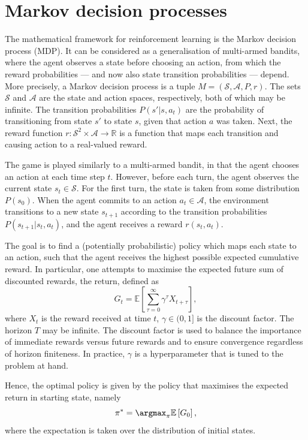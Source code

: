 \section{Markov decision processes}
The mathematical framework for reinforcement learning is the Markov decision process (MDP).
It can be considered as a generalisation of multi-armed bandits, where the agent observes a state before choosing an action, from which the reward probabilities — and now also state transition probabilities — depend.
More precisely, a Markov decision process is a tuple $M = (\mathcal{S}, \mathcal{A}, P, r)$.
The sets $\mathcal{S}$ and $\mathcal{A}$ are the state and action spaces, respectively, both of which may be infinite.
The transition probabilities $P(s' | s, a_t)$ are the probability of transitioning from state $s'$ to state $s$, given that action $a$ was taken.
Next, the reward function $r : \mathcal{S}^2 \times \mathcal{A} \to \mathbb{R}$ is a function that maps each transition and causing action to a real-valued reward.

The game is played similarly to a multi-armed bandit, in that the agent chooses an action at each time step $t$.
However, before each turn, the agent observes the current state $s_t \in \mathcal{S}$.
For the first turn, the state is taken from some distribution $P(s_0)$.
When the agent commits to an action $a_t \in \mathcal{A}$, the environment transitions to a new state $s_{t+1}$ according to the transition probabilities $P(s_{t+1} | s_t, a_t)$, and the agent receives a reward $r(s_t, a_t)$.

The goal is to find a (potentially probabilistic) policy which maps each state to an action, such that the agent receives the highest possible expected cumulative reward.
In particular, one attempts to maximise the expected future sum of discounted rewards, the return, defined as
\begin{equation}
    G_t = \mathbb{E} \left[ \sum_{\tau=0}^{\infty} \gamma^\tau X_{t+\tau} \right],
\end{equation}
where $X_t$ is the reward received at time $t$, $\gamma \in (0,1]$ is the discount factor.
The horizon $T$ may be infinite.
The discount factor is used to balance the importance of immediate rewards versus future rewards and to ensure convergence regardless of horizon finiteness.
In practice, $\gamma$ is a hyperparameter that is tuned to the problem at hand.

Hence, the optimal policy is given by the policy that maximises the expected return in starting state, namely
\begin{equation}
    \pi^* = \argmax_{\pi} \mathbb{E} \left[ G_0 \right],
\end{equation}
where the expectation is taken over the distribution of initial states.

